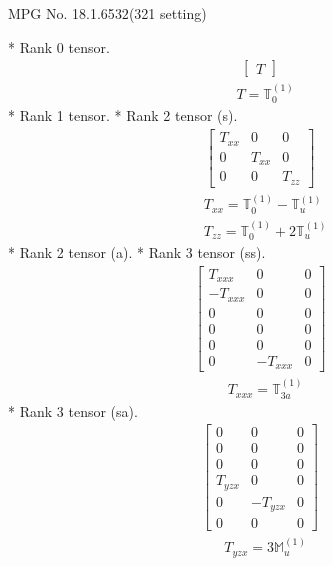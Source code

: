 \documentclass[fleqn,8pt,landscape]{jsarticle}
\begin{document}
\setcounter{MaxMatrixCols}{32}

\renewcommand{\tablename}{Table~}
\renewcommand{\figurename}{Figure~}
\begin{center}
\LARGE
MPG No. 18.1.65\quad$32$\quad(321 setting)
\end{center}
* Rank 0 tensor.
\begin{align*}
\begin{bmatrix} T \end{bmatrix}
\end{align*}
\begin{align*}
& T = \mathbb{T}_{0}^{(1)}
\end{align*}
* Rank 1 tensor.
* Rank 2 tensor (s).
\begin{align*}
\begin{bmatrix} T_{xx} & 0 & 0 \\ 0 & T_{xx} & 0 \\ 0 & 0 & T_{zz} \end{bmatrix}
\end{align*}
\begin{align*}
& T_{xx} = \mathbb{T}_{0}^{(1)} - \mathbb{T}_{u}^{(1)} \\
& T_{zz} = \mathbb{T}_{0}^{(1)} + 2 \mathbb{T}_{u}^{(1)}
\end{align*}
* Rank 2 tensor (a).
* Rank 3 tensor (ss).
\begin{align*}
\begin{bmatrix} T_{xxx} & 0 & 0 \\ - T_{xxx} & 0 & 0 \\ 0 & 0 & 0 \\ 0 & 0 & 0 \\ 0 & 0 & 0 \\ 0 & - T_{xxx} & 0 \end{bmatrix}
\end{align*}
\begin{align*}
& T_{xxx} = \mathbb{T}_{3a}^{(1)}
\end{align*}
* Rank 3 tensor (sa).
\begin{align*}
\begin{bmatrix} 0 & 0 & 0 \\ 0 & 0 & 0 \\ 0 & 0 & 0 \\ T_{yzx} & 0 & 0 \\ 0 & - T_{yzx} & 0 \\ 0 & 0 & 0 \end{bmatrix}
\end{align*}
\begin{align*}
& T_{yzx} = 3 \mathbb{M}_{u}^{(1)}
\end{align*}
\end{document}
